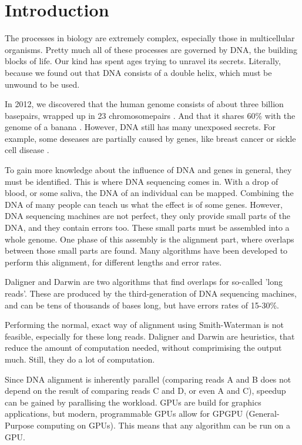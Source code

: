 \documentclass[../main/thesis.tex]{subfiles}
\begin{document}
\chapter{Introduction}
\ifdefined\main
\else

\fi

The processes in biology are extremely complex, especially those in multicellular organisms.
Pretty much all of these processes are governed by DNA, the building blocks of life.
Our kind has spent ages trying to unravel its secrets.
Literally, because we found out that DNA consists of a double helix, which must be unwound to be used.

In 2012, we discovered that the human genome consists of about three billion basepairs, wrapped up in 23 chromosomepairs \cite{human_genome_project}.
And that it shares 60\% with the genome of a banana \cite{banana}.
However, DNA still has many unexposed secrets.
For example, some deseases are partially caused by genes, like breast cancer or sickle cell disease \cite{genomic_diseases}.

To gain more knowledge about the influence of DNA and genes in general, they must be identified.
This is where DNA sequencing comes in.
With a drop of blood, or some saliva, the DNA of an individual can be mapped.
Combining the DNA of many people can teach us what the effect is of some genes.
However, DNA sequencing machines are not perfect, they only provide small parts of the DNA, and they contain errors too.
These small parts must be assembled into a whole genome.
One phase of this assembly is the alignment part, where overlaps between those small parts are found.
Many algorithms have been developed to perform this alignment, for different lengths and error rates.

Daligner and Darwin are two algorithms that find overlaps for so-called 'long reads'.
These are produced by the third-generation of DNA sequencing machines, and can be tens of thousands of bases long, but have errors rates of 15-30\%.

Performing the normal, exact way of alignment using Smith-Waterman is not feasible, especially for these long reads.
Daligner and Darwin are heuristics, that reduce the amount of computation needed, without comprimising the output much.
Still, they do a lot of computation.

Since DNA alignment is inherently parallel (comparing reads A and B does not depend on the result of comparing reads C and D, or even A and C), speedup can be gained by parallising the workload.
GPUs are build for graphics applications, but modern, programmable GPUs allow for GPGPU (General-Purpose computing on GPUs).
This means that any algorithm can be run on a GPU.
\end{document}
